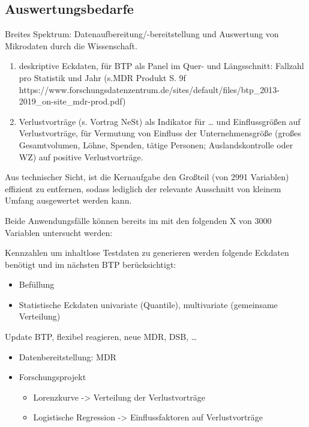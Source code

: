 \documentclass[
  german,
  10pt,
  twoside]{article}
\providecommand{\tightlist}{%
  \setlength{\itemsep}{0pt}\setlength{\parskip}{0pt}}
\begin{document}
\subsection{Auswertungsbedarfe}\label{auswertungsbedarfe}

Breites Spektrum: Datenaufbereitung/-bereitstellung und Auswertung von
Mikrodaten durch die Wissenschaft.

\begin{enumerate}
\def\labelenumi{\arabic{enumi}.}
\item
  deskriptive Eckdaten, für BTP als Panel im Quer- und Längsschnitt:
  Fallzahl pro Statistik und Jahr (s.MDR Produkt S. 9f
  https://www.forschungsdatenzentrum.de/sites/default/files/btp\_2013-2019\_on-site\_mdr-prod.pdf)
\item
  Verlustvorträge (s. Vortrag NeSt) als Indikator für \ldots{} und
  Einflussgrößen auf Verlustvorträge, für Vermutung von Einfluss der
  Unternehmensgröße (großes Gesamtvolumen, Löhne, Spenden, tätige
  Personen; Auslandskontrolle oder WZ) auf positive Verlustvorträge.
\end{enumerate}

Aus technischer Sicht, ist die Kernaufgabe den Großteil (von 2991
Variablen) effizient zu entfernen, sodass lediglich der relevante
Ausschnitt von kleinem Umfang ausgewertet werden kann.

Beide Anwendungsfälle können bereits im mit den folgenden X von 3000
Variablen untersucht werden:

Kennzahlen um inhaltlose Testdaten zu generieren werden folgende
Eckdaten benötigt und im nächsten BTP berücksichtigt:

\begin{itemize}
\tightlist
\item
  Befüllung
\item
  Statistische Eckdaten univariate (Quantile), multivariate (gemeinsame
  Verteilung)
\end{itemize}

Update BTP, flexibel reagieren, neue MDR, DSB, \ldots{}

\begin{itemize}
\tightlist
\item
  Datenbereitstellung: MDR
\item
  Forschungsprojekt

  \begin{itemize}
  \tightlist
  \item
    Lorenzkurve -\textgreater{} Verteilung der Verlustvorträge
  \item
    Logistische Regression -\textgreater{} Einflussfaktoren auf
    Verlustvorträge
  \end{itemize}
\end{itemize}
\end{document}
